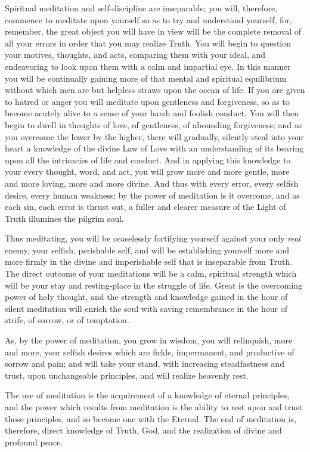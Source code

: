 \documentclass[12pt,oneside]{scrbook}
\begin{document}
  Spiritual meditation and self-discipline are inseparable; you will,
  therefore, commence to meditate upon yourself so as to try and
  understand yourself, for, remember, the great object you will have in
  view will be the complete removal of all your errors in order that you
  may realize Truth. You will begin to question your motives, thoughts,
  and acts, comparing them with your ideal, and endeavoring to look upon
  them with a calm and impartial eye. In this manner you will be
  continually gaining more of that mental and spiritual equilibrium
  without which men are but helpless straws upon the ocean of life. If you
  are given to hatred or anger you will meditate upon gentleness and
  forgiveness, so as to become acutely alive to a sense of your harsh and
  foolish conduct. You will then begin to dwell in thoughts of love, of
  gentleness, of abounding forgiveness; and as you overcome the lower by
  the higher, there will gradually, silently steal into your heart a
  knowledge of the divine Law of Love with an understanding of its bearing
  upon all the intricacies of life and conduct. And in applying this
  knowledge to your every thought, word, and act, you will grow more and
  more gentle, more and more loving, more and more divine. And thus with
  every error, every selfish desire, every human weakness; by the power of
  meditation is it overcome, and as each sin, each error is thrust out, a
  fuller and clearer measure of the Light of Truth illumines the pilgrim
  soul.
  
  Thus meditating, you will be ceaselessly fortifying yourself against
  your only \emph{real} enemy, your selfish, perishable self, and will be
  establishing yourself more and more firmly in the divine and
  imperishable self that is inseparable from Truth. The direct outcome of
  your meditations will be a calm, spiritual strength which will be your
  stay and resting-place in the struggle of life. Great is the overcoming
  power of holy thought, and the strength and knowledge gained in the hour
  of silent meditation will enrich the soul with saving remembrance in the
  hour of strife, of sorrow, or of temptation.
  
  As, by the power of meditation, you grow in wisdom, you will relinquish,
  more and more, your selfish desires which are fickle, impermanent, and
  productive of sorrow and pain; and will take your stand, with increasing
  steadfastness and trust, upon unchangeable principles, and will realize
  heavenly rest.
  
  The use of meditation is the acquirement of a knowledge of eternal
  principles, and the power which results from meditation is the ability
  to rest upon and trust those principles, and so become one with the
  Eternal. The end of meditation is, therefore, direct knowledge of Truth,
  God, and the realization of divine and profound peace.
  
\end{document}
